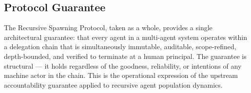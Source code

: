 \subsection{Protocol Guarantee}

The Recursive Spawning Protocol, taken as a whole, provides a single architectural guarantee: that every agent in a multi-agent system operates within a delegation chain that is simultaneously immutable, auditable, scope-refined, depth-bounded, and verified to terminate at a human principal. The guarantee is structural — it holds regardless of the goodness, reliability, or intentions of any machine actor in the chain. This is the operational expression of the upstream \bxthree{} accountability guarantee applied to recursive agent population dynamics.